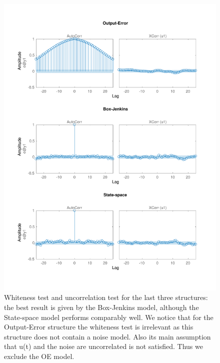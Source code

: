 \documentclass[a4paper,11pt]{article}
\begin{document}
\begin{figure}[H]
\centering
\includegraphics[width = 16cm]{images/4_resid_2}
\caption{Whiteness test and uncorrelation test for the last three structures: the best result is given by the Box-Jenkins model, although the State-space model performs comparably well.
We notice that for the Output-Error structure the whiteness test is irrelevant as this structure does not contain a noise model. Also its main assumption that u(t) and the noise are uncorrelated is not satisfied. Thus we exclude the OE model.}
\label{fig:sys_res2}
\end{figure}
\end{document}
